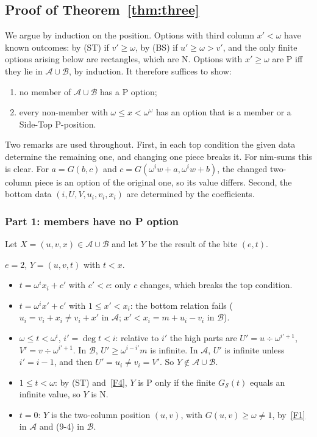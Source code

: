 \documentclass[11pt]{amsart}
\theoremstyle{definition}
\theoremstyle{remark}
\newcommand{\Sc}{\mathcal{S}}
\newcommand{\A}{\mathcal{A}}
\newcommand{\B}{\mathcal{B}}
\newcommand{\G}{G}
\newcommand{\GS}{G_{\Sc}}
\begin{document}
\subsection{Proof of Theorem~\ref{thm:three}}
We argue by induction on the position. Options with third column $x'<\omega$ have known
outcomes: by (ST) if $v'\ge\omega$, by (BS) if $u'\ge\omega>v'$, and the only finite options
arising below are rectangles, which are N. Options with $x'\ge\omega$ are P iff they lie in
$\A\cup\B$, by induction. It therefore suffices to show:
\begin{enumerate}
\item no member of $\A\cup\B$ has a P option;
\item every non-member with $\omega\le x<\omega^\omega$ has an option that is a member or a
  Side-Top P-position.
\end{enumerate}
Two remarks are used throughout. First, in each top condition the given data determine the
remaining one, and changing one piece breaks it. For nim-sums this is clear. For $a=\G(b,c)$ and
$c=\G(\omega^iw+a,\omega^iw+b)$, the changed two-column piece is an option of the original one,
so its value differs. Second, the bottom data $(i,U,V,u_i,v_i,x_i)$ are determined by the
coefficients.

\subsubsection*{Part 1: members have no P option}
Let $X=(u,v,x)\in\A\cup\B$ and let $Y$ be the result of the bite $(e,t)$.

\emph{$e=2$}, $Y=(u,v,t)$ with $t<x$.
\begin{itemize}
\item $t=\omega^ix_i+c'$ with $c'<c$: only $c$ changes, which breaks the top condition.
\item $t=\omega^ix'+c'$ with $1\le x'<x_i$: the bottom relation fails ($u_i=v_i+x_i\ne v_i+x'$ in
  $\A$; $x'<x_i=m+u_i-v_i$ in $\B$).
\item $\omega\le t<\omega^i$, $i'=\deg t<i$: relative to $i'$ the high parts are
  $U'=u\div\omega^{i'+1}$, $V'=v\div\omega^{i'+1}$. In $\B$, $U'\ge\omega^{i-i'}m$ is infinite.
  In $\A$, $U'$ is infinite unless $i'=i-1$, and then $U'=u_i\ne v_i=V'$. So $Y\notin\A\cup\B$.
\item $1\le t<\omega$: by (ST) and~\ref{F4}, $Y$ is P only if the finite $\GS(t)$ equals an
  infinite value, so $Y$ is N.
\item $t=0$: $Y$ is the two-column position $(u,v)$, with $\G(u,v)\ge\omega\ne1$, by~\ref{F1} in
  $\A$ and (9-4) in $\B$.
\end{itemize}
\end{document}
